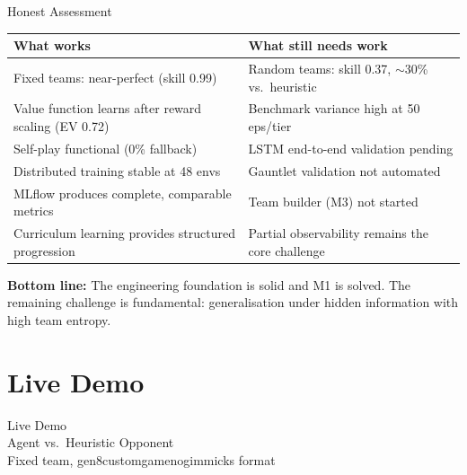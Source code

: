 \documentclass[aspectratio=169, 11pt]{beamer}
\begin{document}
\begin{frame}{Honest Assessment}
  \begin{center}
    \small
    \begin{tabularx}{0.92\textwidth}{X X}
      \toprule
      \textbf{What works} & \textbf{What still needs work} \\
      \midrule
      Fixed teams: near-perfect (skill 0.99) &
        Random teams: skill 0.37, $\sim$30\% vs.\ heuristic \\
      Value function learns after reward scaling (EV 0.72) &
        Benchmark variance high at 50 eps/tier \\
      Self-play functional (0\% fallback) &
        LSTM end-to-end validation pending \\
      Distributed training stable at 48 envs &
        Gauntlet validation not automated \\
      MLflow produces complete, comparable metrics &
        Team builder (M3) not started \\
      Curriculum learning provides structured progression &
        Partial observability remains the core challenge \\
      \bottomrule
    \end{tabularx}
  \end{center}

  \vspace{0.5em}
  \textbf{Bottom line:} The engineering foundation is solid and M1 is solved.
  The remaining challenge is fundamental: generalisation under hidden
  information with high team entropy.
\end{frame}

\section{Live Demo}

\begin{frame}[plain]
  \begin{center}
    \vfill
    {\Huge\color{primaryBlue} Live Demo}\\[1em]
    {\large Agent vs.\ Heuristic Opponent}\\[0.5em]
    {\small\color{gray} Fixed team, gen8customgamenogimmicks format}
    \vfill
  \end{center}
\end{frame}
\end{document}
